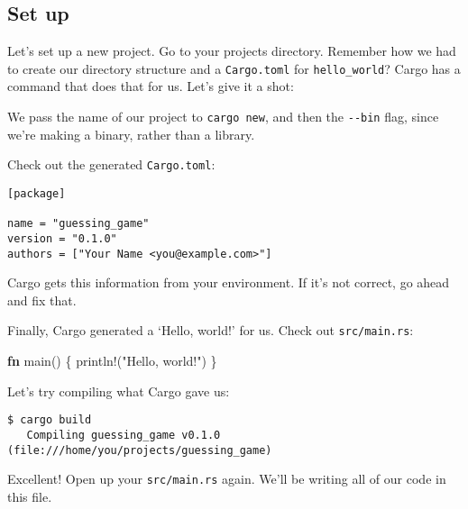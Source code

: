 \documentclass[a4paper,]{book}
\newenvironment{Shaded}{\begin{snugshade}}{\end{snugshade}}
\newcommand{\KeywordTok}[1]{\textcolor[rgb]{0.13,0.29,0.53}{\textbf{{#1}}}}
\newcommand{\StringTok}[1]{\textcolor[rgb]{0.31,0.60,0.02}{{#1}}}
\newcommand{\OtherTok}[1]{\textcolor[rgb]{0.56,0.35,0.01}{{#1}}}
\newcommand{\NormalTok}[1]{{#1}}
\begin{document}
\subsection{Set up}\label{set-up}

Let's set up a new project. Go to your projects directory. Remember how
we had to create our directory structure and a \texttt{Cargo.toml} for
\texttt{hello\_world}? Cargo has a command that does that for us. Let's
give it a shot:

\begin{Shaded}
\end{Shaded}

We pass the name of our project to \texttt{cargo\ new}, and then the
\texttt{-\/-bin} flag, since we're making a binary, rather than a
library.

Check out the generated \texttt{Cargo.toml}:

\begin{verbatim}
[package]

name = "guessing_game"
version = "0.1.0"
authors = ["Your Name <you@example.com>"]
\end{verbatim}

Cargo gets this information from your environment. If it's not correct,
go ahead and fix that.

Finally, Cargo generated a `Hello, world!' for us. Check out
\texttt{src/main.rs}:

\begin{Shaded}
\begin{Highlighting}[]
\KeywordTok{fn} \NormalTok{main() \{}
    \OtherTok{println!}\NormalTok{(}\StringTok{"Hello, world!"}\NormalTok{)}
\NormalTok{\}}
\end{Highlighting}
\end{Shaded}

Let's try compiling what Cargo gave us:

\begin{verbatim}
$ cargo build
   Compiling guessing_game v0.1.0 (file:///home/you/projects/guessing_game)
\end{verbatim}

Excellent! Open up your \texttt{src/main.rs} again. We'll be writing all
of our code in this file.
\end{document}

